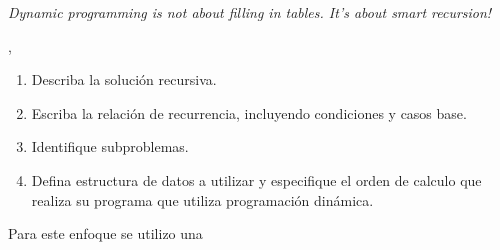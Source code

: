 
\epigraph{\textit{Dynamic programming is not about filling in tables. It's about smart recursion!}}{\citeauthor{algorithms_erickson}, \citeyear{algorithms_erickson} \cite{algorithms_erickson}}

\begin{enumerate}[1]
    \item Describa la solución recursiva.
    \item Escriba la relación de recurrencia, incluyendo condiciones y casos base.
    \item Identifique subproblemas.
    \item Defina estructura de datos a utilizar y especifique el orden de calculo que realiza su programa que utiliza programación dinámica. 
\end{enumerate}

Para este enfoque se utilizo una 


